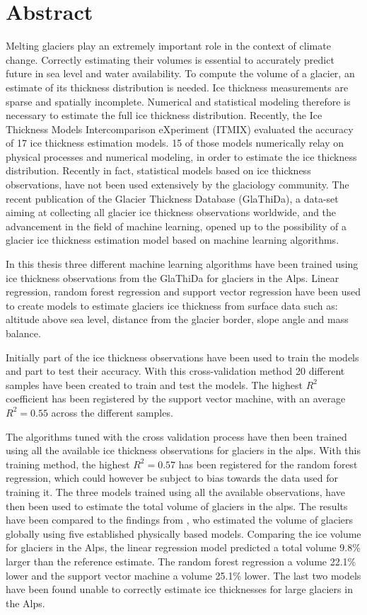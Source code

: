 \chapter*{Abstract}
\thispagestyle{plain}
Melting glaciers play an extremely important role in the context of climate change. Correctly estimating their volumes is essential to accurately predict future in sea level and water availability. To compute the volume of a glacier, an estimate of its thickness distribution is needed. Ice thickness measurements are sparse and spatially incomplete. Numerical and statistical modeling therefore is necessary to estimate the full ice thickness distribution. Recently, the Ice Thickness Models Intercomparison eXperiment (ITMIX) evaluated the accuracy of 17 ice thickness estimation models. 15 of those models numerically relay on physical processes and numerical modeling, in order to estimate the ice thickness distribution. Recently in fact, statistical models based on ice thickness observations, have not been used extensively by the glaciology community. The recent publication of the Glacier Thickness Database (GlaThiDa), a data-set aiming at collecting all glacier ice thickness observations worldwide, and the advancement in the field of machine learning, opened up to the possibility of a glacier ice thickness estimation model based on machine learning algorithms.

In this thesis three different machine learning algorithms have been trained using ice thickness observations from the GlaThiDa for glaciers in the Alps. Linear regression, random forest regression and support vector regression have been used to create models to estimate glaciers ice thickness from surface data such as: altitude above sea level, distance from the glacier border, slope angle and mass balance.
 
Initially part of the ice thickness observations have been used to train the models and part to test their accuracy. With this cross-validation method 20 different samples have been created to train and test the models. The highest $R^2$ coefficient has been registered by the support vector machine, with an average $R^2=0.55$ across the different samples. 

The algorithms tuned with the cross validation process have then been trained using all the available ice thickness observations for glaciers in the alps. With this training method, the highest $R^2=0.57$ has been registered for the random forest regression, which could however be subject to bias towards the data used for training it. The three models trained using all the available observations, have then been used to estimate the total volume of glaciers in the alps. The results have been compared to the findings from  \cite{Farinotti2019}, who estimated the volume of glaciers globally using five established physically based models. Comparing the ice volume for glaciers in the Alps, the linear regression model predicted a total volume 9.8\% larger than the reference estimate. The random forest regression a volume 22.1\% lower and the support vector machine a volume 25.1\% lower. The last two models have been found unable to correctly estimate ice thicknesses for large glaciers in the Alps.

